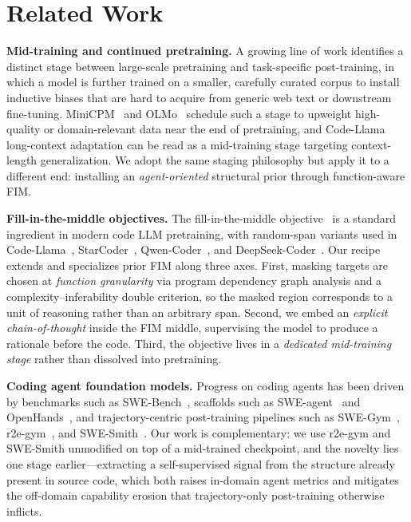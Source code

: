 \section{Related Work}
\vspace{-0.5ex}
\label{sec:related}

\textbf{Mid-training and continued pretraining.}
A growing line of work identifies a distinct stage between large-scale
pretraining and task-specific post-training, in which a model is further
trained on a smaller, carefully curated corpus to install inductive biases
that are hard to acquire from generic web text or downstream fine-tuning.
MiniCPM~\citep{minicpm} and OLMo~\citep{olmo} schedule such a stage to
upweight high-quality or domain-relevant data near the end of pretraining,
and Code-Llama~\citep{codellama} long-context adaptation can be read as a
mid-training stage targeting context-length generalization. We adopt the
same staging philosophy but apply it to a different end: installing an
\textit{agent-oriented} structural prior through function-aware FIM.

\textbf{Fill-in-the-middle objectives.}
The fill-in-the-middle objective~\citep{bavarian2022fim} is a standard
ingredient in modern code LLM pretraining, with random-span variants used
in Code-Llama~\citep{codellama}, StarCoder~\citep{starcoder},
Qwen-Coder~\citep{qwencoder}, and DeepSeek-Coder~\citep{deepseekcoder}.
Our recipe extends and specializes prior FIM along three axes. First,
masking targets are chosen at \textit{function granularity} via program
dependency graph analysis and a complexity--inferability double criterion,
so the masked region corresponds to a unit of reasoning rather than an
arbitrary span. Second, we embed an \textit{explicit chain-of-thought}
inside the FIM middle, supervising the model to produce a rationale
before the code. Third, the objective lives in a \textit{dedicated
mid-training stage} rather than dissolved into pretraining.

\textbf{Coding agent foundation models.}
Progress on coding agents has been driven by benchmarks such as
SWE-Bench~\citep{swebench}, scaffolds such as SWE-agent~\citep{sweagent}
and OpenHands~\citep{openhands}, and trajectory-centric post-training
pipelines such as SWE-Gym~\citep{swegym}, r2e-gym~\citep{r2egym}, and
SWE-Smith~\citep{swesmith}. Our work is complementary: we use r2e-gym and
SWE-Smith unmodified on top of a mid-trained checkpoint, and the novelty
lies one stage earlier---extracting a self-supervised signal from the
structure already present in source code, which both raises in-domain
agent metrics and mitigates the off-domain capability erosion that
trajectory-only post-training otherwise inflicts.

